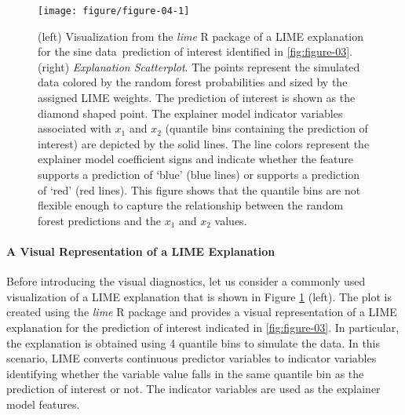 \documentclass[AMS,STIX2COL]{WileyNJD-v2}\usepackage[]{graphicx}\usepackage[]{color}
\newenvironment{knitrout}{}{} %
\newcommand{\data}{sine data}
\begin{document}
\begin{figure}[!thp]
\begin{knitrout}
\color{fgcolor}

{\centering \texttt{[image: figure/figure-04-1]} 

}



\end{knitrout}
\caption{(left) Visualization from the \emph{lime} R package of a LIME explanation for the \data \ prediction of interest identified in \autoref{fig:figure-03}. (right) \emph{Explanation Scatterplot}. The points represent the simulated data colored by the random forest probabilities and sized by the assigned LIME weights. The prediction of interest is shown as the diamond shaped point. The explainer model indicator variables associated with $x_1$ and $x_2$ (quantile bins containing the prediction of interest) are depicted by the solid lines. The line colors represent the explainer model coefficient signs and indicate whether the feature supports a prediction of `blue' (blue lines) or supports a prediction of `red' (red lines). This figure shows that the quantile bins are not flexible enough to capture the relationship between the random forest predictions and the $x_1$ and $x_2$ values.}
\label{fig:figure-04}
\end{figure}

\paragraph{A Visual Representation of a LIME Explanation}

Before introducing the visual diagnostics, let us consider a commonly used visualization of a LIME explanation that is shown in Figure \ref{fig:figure-04} (left). The plot is created using the \emph{lime} R package and provides a visual representation of a LIME explanation for the prediction of interest indicated in \autoref{fig:figure-03}. In particular, the explanation is obtained using 4 quantile bins to simulate the data. In this scenario, LIME converts continuous predictor variables to indicator variables identifying whether the variable value falls in the same quantile bin as the prediction of interest or not. The indicator variables are used as the explainer model features.  
\end{document}
